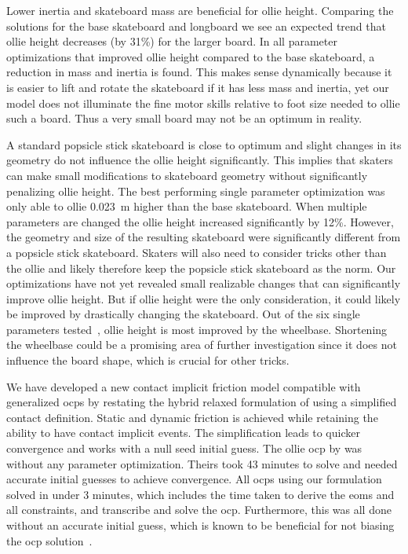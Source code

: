 \documentclass[default,iicol,pdflatex]{sn-jnl}
\begin{document}
Lower inertia and skateboard mass are beneficial for ollie height.
Comparing the solutions for the base skateboard and longboard we see an expected trend that ollie height decreases (by 31\%) for the larger board.
In all parameter optimizations that improved ollie height compared to the base skateboard, a reduction in mass and inertia is found.
This makes sense dynamically because it is easier to lift and rotate the skateboard if it has less mass and inertia, yet our model does not illuminate the fine motor skills relative to foot size needed to ollie such a board. Thus a very small board may not be an optimum in reality.

A standard popsicle stick skateboard is close to optimum and slight changes in its geometry do not influence the ollie height significantly.
This implies that skaters can make small modifications to skateboard geometry without significantly penalizing ollie height.
The best performing single parameter optimization was only able to ollie \SI{0.023}{\meter} higher than the base skateboard.
When multiple parameters are changed the ollie height increased significantly by 12\%.
However, the geometry and size of the resulting skateboard were significantly different from a popsicle stick skateboard.
Skaters will also need to consider tricks other than the ollie and likely therefore keep the popsicle stick skateboard as the norm. Our optimizations have not yet revealed small realizable changes that can  significantly improve ollie height.
But if ollie height were the only consideration, it could likely be improved by drastically changing the skateboard.
Out of the six single parameters tested~\cite{heinen_optimal_2022}, ollie height is most improved by the wheelbase.
Shortening the wheelbase could be a promising area of further investigation since it does not influence the board shape, which is crucial for other tricks.

We have developed a new contact implicit friction model compatible with generalized \gls{ocp}s by restating the hybrid relaxed formulation of \citet{patel_contact-implicit_2019} using a simplified contact definition.
Static and dynamic friction is achieved while retaining the ability to have contact implicit events.
The simplification leads to quicker convergence and works with a null seed initial guess.
The ollie \gls{ocp} by \citet{shield_contact-implicit_2022} was without any parameter optimization. Theirs took 43 minutes to solve and needed accurate initial guesses to achieve convergence.
All \glspl{ocp} using our formulation solved in under 3 minutes, which includes the time taken to derive the \glspl{eom} and all constraints, and transcribe and solve the \gls{ocp}.
Furthermore, this was all done without an accurate initial guess, which is known to be beneficial for not biasing the \gls{ocp} solution~\cite{betts_practical_2010}.
\end{document}
